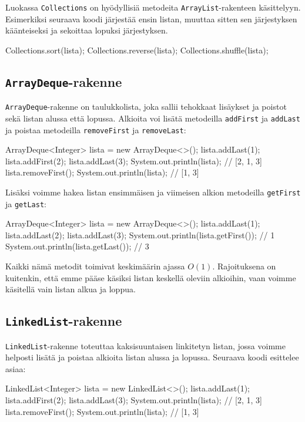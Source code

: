 Luokassa \texttt{Collections} on hyödyllisiä metodeita
\texttt{ArrayList}-rakenteen käsittelyyn.
Esimerkiksi seuraava koodi järjestää ensin listan,
muuttaa sitten sen järjestyksen käänteiseksi
ja sekoittaa lopuksi järjestyksen.

\begin{code}
Collections.sort(lista);
Collections.reverse(lista);
Collections.shuffle(lista);
\end{code}

\subsection{\texttt{ArrayDeque}-rakenne}

\texttt{ArrayDeque}-rakenne on taulukkolista,
joka sallii tehokkaat lisäykset ja poistot
sekä listan alussa että lopussa.
Alkioita voi lisätä
metodeilla \texttt{addFirst} ja \texttt{addLast}
ja poistaa
metodeilla \texttt{removeFirst} ja \texttt{removeLast}:

\begin{code}
ArrayDeque<Integer> lista = new ArrayDeque<>();
lista.addLast(1);
lista.addFirst(2);
lista.addLast(3);
System.out.println(lista); // [2, 1, 3]
lista.removeFirst();
System.out.println(lista); // [1, 3]
\end{code}

Lisäksi voimme hakea listan ensimmäisen ja viimeisen
alkion metodeilla \texttt{getFirst} ja \texttt{getLast}:

\begin{code}
ArrayDeque<Integer> lista = new ArrayDeque<>();
lista.addLast(1);
lista.addLast(2);
lista.addLast(3);
System.out.println(lista.getFirst()); // 1
System.out.println(lista.getLast()); // 3
\end{code}

Kaikki nämä metodit toimivat keskimäärin ajassa $O(1)$.
Rajoituksena on kuitenkin, että emme pääse käsiksi
listan keskellä oleviin alkioihin, vaan voimme käsitellä
vain listan alkua ja loppua.

\subsection{\texttt{LinkedList}-rakenne}

\texttt{LinkedList}-rakenne toteuttaa kaksisuuntaisen
linkitetyn listan, jossa voimme helposti lisätä ja poistaa
alkioita listan alussa ja lopussa.
Seuraava koodi esittelee asiaa:

\begin{code}
LinkedList<Integer> lista = new LinkedList<>();
lista.addLast(1);
lista.addFirst(2);
lista.addLast(3);
System.out.println(lista); // [2, 1, 3]
lista.removeFirst();
System.out.println(lista); // [1, 3]
\end{code}

